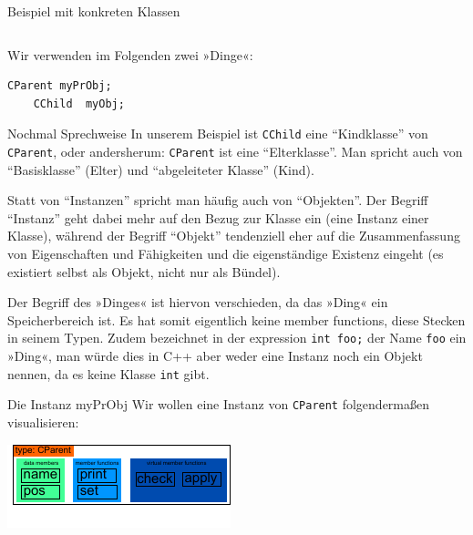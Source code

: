 \begin{frame}[fragile]{Beispiel mit konkreten Klassen}
	\footnotesize
	\begin{columns}
		
		
		
	\end{columns}
	
	\pause
	\vspace{1em}
	
	Wir verwenden im Folgenden zwei »Dinge«:
	\begin{lstlisting}[lanuage=C++]
	CParent myPrObj;
	CChild  myObj;
	\end{lstlisting}
\end{frame}

\begin{frame}[fragile]{Nochmal Sprechweise}
	In unserem Beispiel ist \verb|CChild| eine \enquote{Kindklasse} von \verb|CParent|, oder andersherum: \verb|CParent| ist eine \enquote{Elterklasse}. Man spricht auch von \enquote{Basisklasse} (Elter) und \enquote{abgeleiteter Klasse} (Kind).
	
	\pause
	\vspace{1em}
	
	Statt von \enquote{Instanzen} spricht man häufig auch von \enquote{Objekten}. Der Begriff \enquote{Instanz} geht dabei mehr auf den Bezug zur Klasse ein (eine Instanz einer Klasse), während der Begriff \enquote{Objekt} tendenziell eher auf die Zusammenfassung von Eigenschaften und Fähigkeiten und die eigenständige Existenz eingeht (es existiert selbst als Objekt, nicht nur als Bündel).
	
	\pause
	\vspace{1em}
	
	Der Begriff des »Dinges« ist hiervon verschieden, da das »Ding« ein Speicherbereich ist. Es hat somit eigentlich keine member functions, diese Stecken in seinem Typen. Zudem bezeichnet in der expression \verb|int foo;| der Name \verb|foo| ein »Ding«, man würde dies in C++ aber weder eine Instanz noch ein Objekt nennen, da es keine Klasse \verb|int| gibt.
\end{frame}

\begin{frame}[fragile,b]{Die Instanz myPrObj}
	Wir wollen eine Instanz von \verb|CParent| folgendermaßen visualisieren:
	
	\vspace{2em}
	
	\includegraphics[width=0.5\linewidth]{images/myPrObj}
\end{frame}

